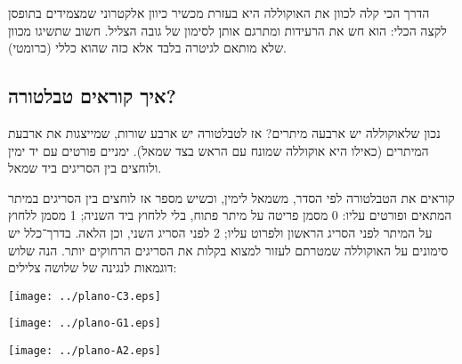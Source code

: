 הדרך הכי קלה לכוון את האוקוללה היא בעזרת מכשיר כיוון אלקטרוני שמצמידים בתופסן לקצה הכלי: הוא חש את הרעידות ומתרגם אותן לסימון של גובה הצליל. חשוב שתשיגו מכוון שלא מותאם לגיטרה בלבד אלא כזה שהוא כללי (כרומטי).



\subsection*{איך קוראים טבלטורה?}

נכון שלאוקוללה יש ארבעה מיתרים? אז לטבלטורה יש ארבע שורות, שמייצגות את ארבעת המיתרים (כאילו היא אוקוללה שמונח עם הראש בצד שמאל). ימניים פורטים עם יד ימין ולוחצים בין הסריגים ביד שמאל.

קוראים את הטבלטורה לפי הסדר, משמאל לימין, וכשיש מספר אז לוחצים בין הסריגים במיתר המתאים ופורטים עליו: 0 מסמן פריטה על מיתר פתוח, בלי ללחוץ ביד השניה; 1 מסמן ללחוץ על המיתר לפני הסריג הראשון ולפרוט עליו; 2 לפני הסריג השני, וכן הלאה. בדרך־כלל יש סימונים על האוקוללה שמטרתם לעזור למצוא בקלות את הסריגים הרחוקים יותר. הנה שלוש דוגמאות לנגינה של שלושה צלילים:

\vspace{\baselineskip}
\begin{minipage}{4cm}
	\centering
	\texttt{[image: ../plano-C3.eps]}\\
\end{minipage}\hfill
\begin{minipage}{4cm}
	\centering
	\texttt{[image: ../plano-G1.eps]}\\
\end{minipage}\hfill
\begin{minipage}{4cm}
	\centering
	\texttt{[image: ../plano-A2.eps]}\\
\end{minipage}
\vspace{\baselineskip}

